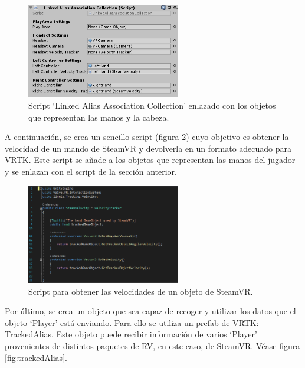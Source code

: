 \begin{figure}
  \centering
    \includegraphics[width=0.6\textwidth]{04.Desarrollo/01.Entrega1/02.Iteracion1_2/00.Figuras/02.linked_alias_collection.png}
    \caption{Script ‘Linked Alias Association Collection’ enlazado con los objetos que representan las manos y la cabeza.}
    \label{fig:linkedAliasAssociationCollection}
\end{figure}

A continuación, se crea un sencillo script (figura \ref{fig:scriptVelocities}) cuyo objetivo es obtener la velocidad de un mando de SteamVR y devolverla en un formato adecuado para VRTK. Este script se añade a los objetos que representan las manos del jugador y se enlazan con el script de la sección anterior.

\begin{figure}
  \centering
    \includegraphics[width=0.6\textwidth]{04.Desarrollo/01.Entrega1/02.Iteracion1_2/00.Figuras/03.script_velocities.png}
    \caption{Script para obtener las velocidades de un objeto de SteamVR.}
    \label{fig:scriptVelocities}
\end{figure}

Por último, se crea un objeto que sea capaz de recoger y utilizar los datos que el objeto ‘Player’ está enviando. Para ello se utiliza un prefab de VRTK: TrackedAlias. Este objeto puede recibir información de varios ‘Player’ provenientes de distintos paquetes de RV, en este caso, de SteamVR. Véase figura \ref{fig:trackedAlias}.

